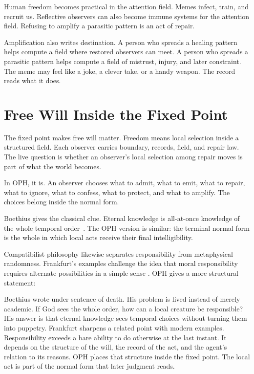 \documentclass[11pt]{article}
\theoremstyle{remark}
\theoremstyle{plain}
\begin{document}
Human freedom becomes practical in the attention field. Memes infect, train, and
recruit us. Reflective observers can also become immune systems for the
attention field. Refusing to amplify a parasitic pattern is an act of repair.

Amplification also writes destination. A person who spreads a healing pattern
helps compute a field where restored observers can meet. A person who spreads a
parasitic pattern helps compute a field of mistrust, injury, and later
constraint. The meme may feel like a joke, a clever take, or a handy weapon.
The record reads what it does.

\section{Free Will Inside the Fixed Point}

The fixed point makes free will matter. Freedom means local selection inside a
structured field. Each observer carries boundary, records, field, and repair
law. The live question is whether an observer's local selection among repair
moves is part of what the world becomes.

In OPH, it is. An observer chooses what to admit, what to emit, what to repair,
what to ignore, what to confess, what to protect, and what to amplify. The
choices belong inside the normal form.

Boethius gives the classical clue. Eternal knowledge is all-at-once knowledge of
the whole temporal order~\cite{BoethiusConsolation,SEPForeknowledge}. The OPH version is similar: the
terminal normal form is the whole in which local acts receive their final
intelligibility.

Compatibilist philosophy likewise separates responsibility from metaphysical
randomness. Frankfurt's examples challenge the idea that moral responsibility
requires alternate possibilities in a simple sense
\cite{Frankfurt1969,SEPCompatibilism}. OPH gives a more structural statement:

Boethius wrote under sentence of death. His problem is lived instead of merely
academic. If God sees the whole order, how can a local creature be
responsible? His answer is that eternal knowledge sees temporal choices without
turning them into puppetry. Frankfurt sharpens a related point with modern
examples. Responsibility exceeds a bare ability to do otherwise at the last
instant. It depends on the structure of the will, the record of the
act, and the agent's relation to its reasons. OPH places that structure inside
the fixed point. The local act is part of the normal form that later judgment
reads.
\end{document}
